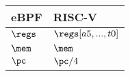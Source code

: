 \begin{tabular}{ll}
\toprule
eBPF & RISC-V \\
\midrule
$\regs$ & $\regs[a5, ..., t0]$\\ 
$\mem$ & $\mem$\\
$\pc$ & $\pc / 4$\\
\bottomrule
\end{tabular}

